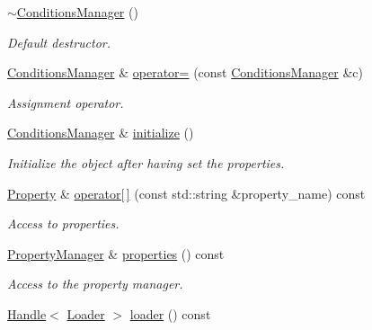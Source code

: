 \begin{DoxyCompactItemize}
\hyperlink{class_d_d4hep_1_1_conditions_1_1_conditions_manager_ab16fe390c87fa0c67f984425be46c9ca}{$\sim$ConditionsManager} ()
\begin{DoxyCompactList}\small\item\em Default destructor. \item\end{DoxyCompactList}\item 
\hyperlink{class_d_d4hep_1_1_conditions_1_1_conditions_manager}{ConditionsManager} \& \hyperlink{class_d_d4hep_1_1_conditions_1_1_conditions_manager_a4bffb6047b5d192da0a630dd347616eb}{operator=} (const \hyperlink{class_d_d4hep_1_1_conditions_1_1_conditions_manager}{ConditionsManager} \&c)
\begin{DoxyCompactList}\small\item\em Assignment operator. \item\end{DoxyCompactList}\item 
\hyperlink{class_d_d4hep_1_1_conditions_1_1_conditions_manager}{ConditionsManager} \& \hyperlink{class_d_d4hep_1_1_conditions_1_1_conditions_manager_a5908a4b7d16963e26e7bc453eae9bd40}{initialize} ()
\begin{DoxyCompactList}\small\item\em Initialize the object after having set the properties. \item\end{DoxyCompactList}\item 
\hyperlink{class_d_d4hep_1_1_property}{Property} \& \hyperlink{class_d_d4hep_1_1_conditions_1_1_conditions_manager_a32b209109e8a5c26ac1b6d8ca688c9dc}{operator\mbox{[}$\,$\mbox{]}} (const std::string \&property\_\-name) const 
\begin{DoxyCompactList}\small\item\em Access to properties. \item\end{DoxyCompactList}\item 
\hyperlink{class_d_d4hep_1_1_property_manager}{PropertyManager} \& \hyperlink{class_d_d4hep_1_1_conditions_1_1_conditions_manager_accf8571c5f7f183a6749539b87d489cd}{properties} () const 
\begin{DoxyCompactList}\small\item\em Access to the property manager. \item\end{DoxyCompactList}\item 
\hyperlink{class_d_d4hep_1_1_handle}{Handle}$<$ \hyperlink{class_d_d4hep_1_1_conditions_1_1_conditions_data_loader}{Loader} $>$ \hyperlink{class_d_d4hep_1_1_conditions_1_1_conditions_manager_ad7474bdaff36fc37418bdfbe2c278383}{loader} () const 

\end{DoxyCompactItemize}
